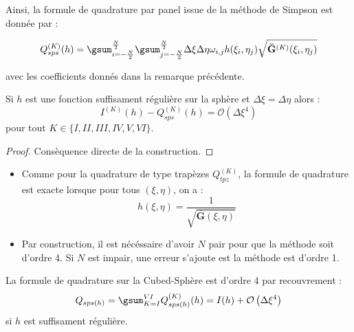 Ainsi, la formule de quadrature par panel issue de la méthode de Simpson est donnée par :

\begin{equation}
Q_{sps}^{(K)}(h)=\gsum_{i = -\frac{N}{2}}^{\frac{N}{2}}\gsum_{j = -\frac{N}{2}}^{\frac{N}{2}} \Delta \xi \Delta \eta \omega_{i,j} h(\xi_i, \eta_j) \sqrt{\mathbf{\bar{G}}^{(K)}(\xi_i, \eta_j)}
\label{eq:simpson par panel}
\end{equation}

avec les coefficients donnés dans la remarque précédente.

\begin{proposition}
Si $h$ est une fonction suffisament régulière sur la sphère et $\Delta \xi = \Delta \eta$ alors :
\begin{equation}
I^{(K)}(h) - Q^{(K)}_{sps}(h) = \mathcal{O} \left( \Delta \xi^4 \right)
\end{equation}
pour tout $K \in \lbrace I, II, III, IV, V, VI \rbrace$.
\label{prop:consistance sps panel}
\end{proposition}

\begin{proof}
Consèquence directe de la construction.
\end{proof}

\begin{remarque}
\begin{itemize}
\item Comme pour la quadrature de type trapèzes $Q_{tpz}^{(K)}$, la formule de quadrature est exacte lorsque pour tous $(\xi,\eta)$, on a :
\begin{equation}
h(\xi,\eta)=\dfrac{1}{\sqrt{\overline{\mathbf{G}}(\xi,\eta)}}
\end{equation}
\item Par construction, il est nécéssaire d'avoir $N$ pair pour que la méthode soit d'ordre 4. Si $N$ est impair, une erreur s'ajoute est la méthode est d'ordre 1.
\end{itemize}
\end{remarque}

\begin{corollaire}
La formule de quadrature sur la Cubed-Sphère est d'ordre 4 par recouvrement :
\begin{equation}
Q_{sps(h)}=\gsum_{K=I}^{VI} Q_{sps(h)}^{(K)}(h) = I(h) + \mathcal{O} \left( \Delta \xi^4 \right)
\end{equation}
si $h$ est suffisament régulière.
\end{corollaire}
















